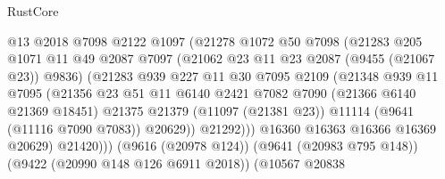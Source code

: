 \begin{lexlean}{RustCore}
\begin{coremodule}
                                  @13
                                  @2018
                                  @7098
                                  @2122
                                  @1097
                                  (@21278
                                    @1072
                                    @50
                                    @7098
                                    (@21283
                                      @205
                                      @1071
                                      @11
                                      @49
                                      @2087
                                      @7097
                                      (@21062 @23 @11 @23 @2087 (@9455 (@21067 @23)) @9836)
                                      (@21283
                                        @939
                                        @227
                                        @11
                                        @30
                                        @7095
                                        @2109
                                        (@21348
                                          @939
                                          @11
                                          @7095
                                          (@21356
                                            @23
                                            @51
                                            @11
                                            @6140
                                            @2421
                                            @7082
                                            @7090
                                            (@21366 @6140 @21369 @18451)
                                            @21375
                                            @21379
                                            (@11097 (@21381 @23))
                                            @11114
                                            (@9641 (@11116 @7090 @7083))
                                            @20629))
                                        @21292)))
                                  @16360
                                  @16363
                                  @16366
                                  @16369
                                  @20629)
                                @21420)))
                          (@9616 (@20978 @124))
                          (@9641 (@20983 @795 @148))
                          (@9422 (@20990 @148 @126 @6911 @2018))
                          (@10567
                            @20838

\end{coremodule}
\end{lexlean}
